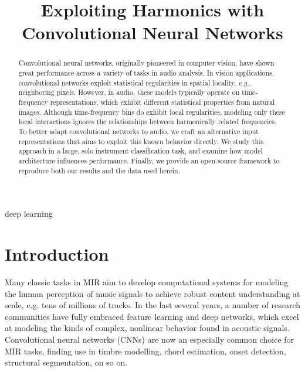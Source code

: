 \documentclass{article}
\title{Exploiting Harmonics with Convolutional Neural Networks}
\begin{document}
%
\maketitle
%
\begin{abstract}

Convolutional neural networks, originally pioneered in computer vision, have shown great performance across a variety of tasks in audio analysis.
In vision applications, convolutional networks exploit statistical regularities in spatial locality, \emph{e.g.}, neighboring pixels.
However, in audio, these models typically operate on time-frequency representations, which exhibit different statistical properties from natural images.
Although time-frequency bins do exhibit local regularities, modeling only these local interactions ignores the relationships between harmonically related frequencies.
To better adapt convolutional networks to audio, we craft an alternative input representations that aims to exploit this known behavior directly.
We study this approach in a large, solo instrument classification task, and examine how model architecture influences performance.
Finally, we provide an open source framework to reproduce both our results and the data used herein.
\end{abstract}

\begin{keywords}
    deep learning
\end{keywords}
\section{Introduction}\label{sec:introduction}

Many classic tasks in MIR aim to develop computational systems for modeling the human perception of music signals to achieve robust content understanding at scale, e.g. tens of millions of tracks.
In the last several years, a number of research communities have fully embraced feature learning and deep networks, which excel at modeling the kinds of complex, nonlinear behavior found in acoustic signals.
Convolutional neural networks (CNNs) are now an especially common choice for MIR tasks, finding use in timbre modelling, chord estimation, onset detection, structural segmentation, on so on.
\end{document}

